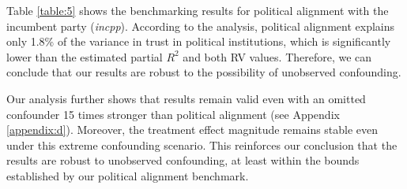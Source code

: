 \documentclass{article}
\begin{document}
Table \ref{table:5} shows the benchmarking results for political alignment with the incumbent party (\emph{incpp}). According to the analysis, political alignment explains only 1.8\% of the variance in trust in political institutions, which is significantly lower than the estimated partial $R^2$ and both RV values. Therefore, we can conclude that our results are robust to the possibility of unobserved confounding.



Our analysis further shows that results remain valid even with an omitted confounder 15 times stronger than political alignment (see Appendix \ref{appendix:d}). Moreover, the treatment effect magnitude remains stable even under this extreme confounding scenario. This reinforces our conclusion that the results are robust to unobserved confounding, at least within the bounds established by our political alignment benchmark.




\end{document}
